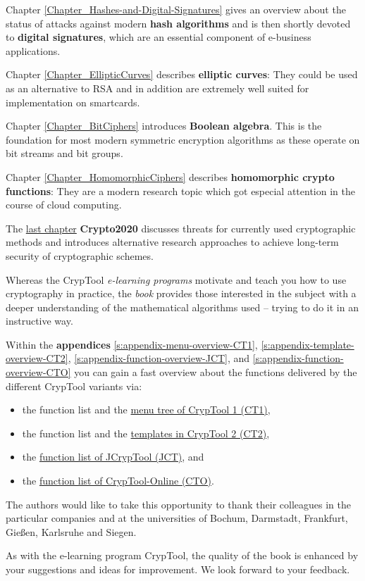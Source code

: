 Chapter \ref{Chapter_Hashes-and-Digital-Signatures} gives
an overview about the status of attacks against modern {\bf hash algorithms}
and is then shortly devoted to {\bf digital signatures}, 
which are an essential component of e-business applications.

Chapter \ref{Chapter_EllipticCurves} describes {\bf elliptic curves}:
They could be used as an alternative to RSA and in addition are extremely
well suited for implementation on smartcards.

Chapter \ref{Chapter_BitCiphers} introduces {\bf Boolean algebra}.
This is the foundation for most modern symmetric encryption algorithms
as these operate on bit streams and bit groups.

Chapter \ref{Chapter_HomomorphicCiphers} describes {\bf homomorphic crypto
functions}: They are a modern research topic which got especial attention
in the course of cloud computing.

The \hyperlink{Chapter_Crypto2020}{last chapter} {\bf Crypto2020}
discusses threats for currently used cryptographic methods and introduces
alternative research approaches to achieve long-term security
of cryptographic schemes.

Whereas the CrypTool \textit{e-learning programs} motivate
and teach you how to use cryptography in practice, the \textit{book} provides
those interested in the subject with a deeper understanding of the mathematical
algorithms used -- trying to do it in an instructive way.

Within the {\bf appendices}
\ref{s:appendix-menu-overview-CT1},
\ref{s:appendix-template-overview-CT2},
\ref{s:appendix-function-overview-JCT}, and
\ref{s:appendix-function-overview-CTO}
you can gain a fast overview about the functions delivered by the different
CrypTool variants via:
\begin{itemize}
  \item the function list and
        the \hyperlink{appendix-menu-overview-CT1}
                      {menu tree of CrypTool 1 (CT1)},
  \item the function list and
        the \hyperlink{appendix-template-overview-CT2}
                      {templates in CrypTool 2 (CT2)},
  \item the \hyperlink{appendix-function-overview-JCT}
                      {function list of JCrypTool (JCT)}, and
  \item the \hyperlink{appendix-function-overview-CTO}
                      {function list of CrypTool-Online (CTO)}.
\end{itemize}

The authors would like to take this opportunity to thank their colleagues 
in the particular companies and at the universities of Bochum, Darmstadt,
Frankfurt, Gie\ss en, Karlsruhe and Siegen.

\enlargethispage{12pt}
As with the e-learning program CrypTool, the quality of the 
book is enhanced by your suggestions and ideas for improvement. 
We look forward to your feedback.


